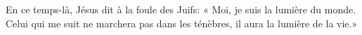 En ce temps-là, Jésus dit à la foule des Juifs:
	« Moi, je suis la lumière du monde.
Celui qui me suit ne marchera pas dans les ténèbres,
	il aura la lumière de la vie.»
